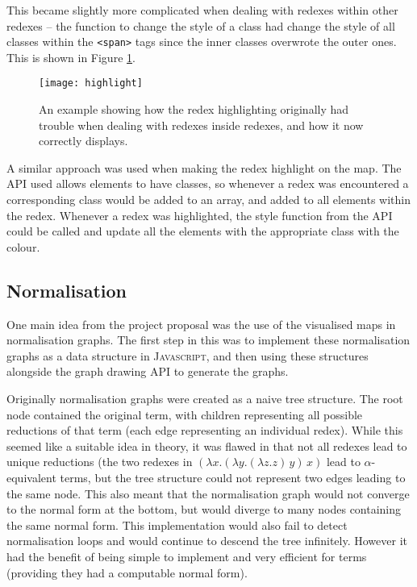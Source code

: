 \documentclass[11pt]{article}
\begin{document}
This became slightly more complicated when dealing with redexes within other redexes -- the function to change the style of a class had change the style of all classes within the \texttt{<span>} tags since the inner classes overwrote the outer ones. This is shown in Figure \ref{fig:highlight}.

\begin{figure}
    \centering
    \texttt{[image: highlight]}
    \caption{An example showing how the redex highlighting originally had trouble when dealing with redexes inside redexes, and how it now correctly displays.}
    \label{fig:highlight}
\end{figure}

A similar approach was used when making the redex highlight on the map. The API used allows elements to have classes, so whenever a redex was encountered a corresponding class would be added to an array, and added to all elements within the redex. Whenever a redex was highlighted, the style function from the API could be called and update all the elements with the appropriate class with the colour.

\subsection{Normalisation}
One main idea from the project proposal was the use of the visualised maps in normalisation graphs. The first step in this was to implement these normalisation graphs as a data structure in \textsc{Javascript}, and then using these structures alongside the graph drawing API to generate the graphs.

Originally normalisation graphs were created as a naive tree structure. The root node contained the original term, with children representing all possible reductions of that term (each edge representing an individual redex). While this seemed like a suitable idea in theory, it was flawed in that not all redexes lead to unique reductions (the two redexes in $(\lambda x. (\lambda y. (\lambda z. z) \, y) \, x)$ lead to $\alpha$-equivalent terms, but the tree structure could not represent two edges leading to the same node. This also meant that the normalisation graph would not converge to the normal form at the bottom, but would diverge to many nodes containing the same normal form. This implementation would also fail to detect normalisation loops and would continue to descend the tree infinitely. However it had the benefit of being simple to implement and very efficient for terms (providing they had a computable normal form).
\end{document}
